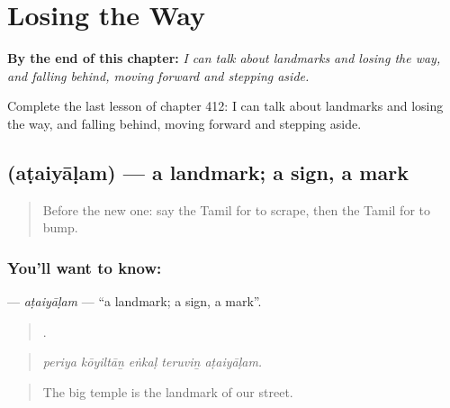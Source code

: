 
\chapter{Losing the Way}
\label{ch:ta-losing-the-way}

\begin{chapteropening}
\textbf{By the end of this chapter:} \emph{I can talk about landmarks and losing the way, and falling behind, moving forward and stepping aside.}

Complete the last lesson of chapter 412: I can talk about landmarks and losing the way, and falling behind, moving forward and stepping aside.
\end{chapteropening}

\section[\texorpdfstring{\ta{அடையாளம்} (aṭaiyāḷam)}{அடையாளம் (aṭaiyāḷam)}]{ (aṭaiyāḷam) — a landmark; a sign, a mark}

\label{lesson:TA-C412-ataiyalam}



\begin{quote}
Before the new one: say the Tamil for to scrape, then the Tamil for to bump.
\end{quote}

\subsection*{You'll want to know: }
\textbf{} — \emph{aṭaiyāḷam} — \textquotedblleft{}a landmark; a sign, a mark\textquotedblright{}.

\begin{quote}
    .
\end{quote}

\begin{quote}
\emph{periya kōyiltāṉ eṅkaḷ teruviṉ aṭaiyāḷam.}
\end{quote}

\begin{quote}
The big temple is the landmark of our street.
\end{quote}

